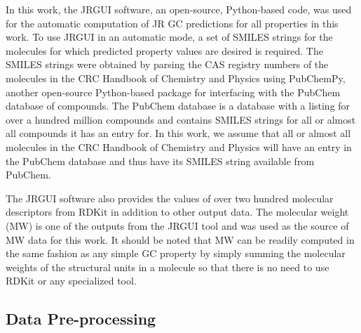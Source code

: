 \documentclass[journal=jacsat,manuscript=article]{achemso}
\begin{document}
In this work, the JRGUI software, an open-source, Python-based code, was used for the automatic computation of JR GC predictions for all properties in this work. To use JRGUI in an automatic mode, a set of SMILES strings for the molecules for which predicted property values are desired is required. 
The SMILES strings were obtained by parsing the CAS registry numbers of the molecules in the CRC Handbook of Chemistry and Physics using PubChemPy, another open-source Python-based package for interfacing with the PubChem database of compounds. The PubChem database is a database with a listing for over a hundred million compounds and contains SMILES strings for all or almost all compounds it has an entry for. In this work, we assume that all or almost all molecules in the CRC Handbook of Chemistry and Physics will have an entry in the PubChem database and thus have its SMILES string available from PubChem.

The JRGUI software also provides the values of over two hundred molecular descriptors from RDKit in addition to other output data. The molecular weight (MW) is one of the outputs from the JRGUI tool and was used as the source of MW data for this work. It should be noted that MW can be readily computed in the same fashion as any simple GC property by simply summing the molecular weights of the structural units in a molecule so that there is no need to use RDKit or any specialized tool.

\subsection{Data Pre-processing} \label{sec:preprocess}
\end{document}
